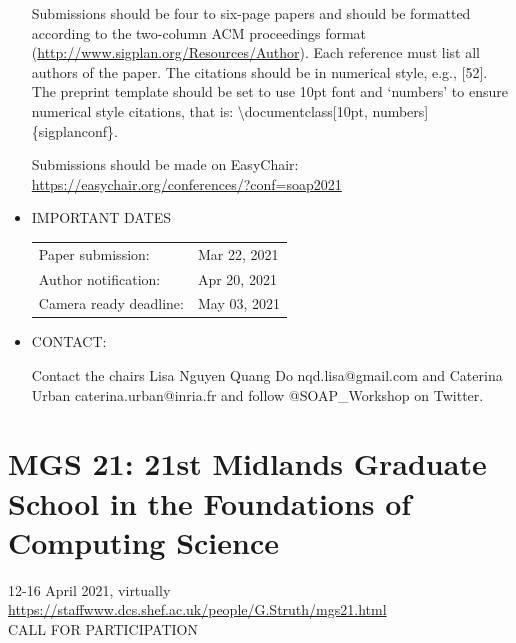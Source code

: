\documentclass[prodmode,acmtecs]{acmsmall} %
\begin{document}
\begin{itemize}
  Submissions should be four to six-page papers and should be formatted according to the two-column ACM proceedings format (\href{http://www.sigplan.org/Resources/Author}{http://www.sigplan.org/Resources/Author}). Each reference must list all authors of the paper. The citations should be in numerical style, e.g., [52]. The preprint template should be set to use 10pt font and ‘numbers’ to ensure numerical style citations, that is: \textbackslash{}documentclass[10pt, numbers]\{sigplanconf\}.  
 
  Submissions should be made on EasyChair: \href{https://easychair.org/conferences/?conf=soap2021}{https://easychair.org/conferences/?conf=soap2021} 
 
\item  IMPORTANT DATES 
 
\begin{tabulary}{\linewidth}{LL}Paper submission:  & Mar 22, 2021 \\
Author notification:  & Apr 20, 2021 \\
Camera ready deadline:  & May 03, 2021 \\
\end{tabulary}
 
\item  CONTACT:  
 
  Contact the chairs Lisa Nguyen Quang Do nqd.lisa@gmail.com and Caterina Urban caterina.urban@inria.fr and follow @SOAP\_Workshop on Twitter. 
 
\end{itemize}\section{MGS 21: 21st Midlands Graduate School in the Foundations of Computing Science}\label{MGS21}  12-16 April 2021, virtually\\ 
  \href{https://staffwww.dcs.shef.ac.uk/people/G.Struth/mgs21.html}{https://staffwww.dcs.shef.ac.uk/people/G.Struth/mgs21.html}\\ 
CALL FOR PARTICIPATION 
\end{document}
